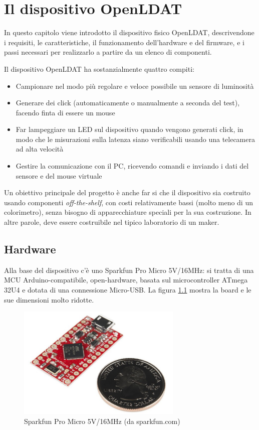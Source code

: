 \setlength{\parskip}{10pt}
\setlength{\parindent}{0pt}
\chapter{Il dispositivo OpenLDAT}
\label{chap:device}

In questo capitolo viene introdotto il dispositivo fisico OpenLDAT, descrivendone i requisiti, le caratteristiche, il funzionamento dell'hardware e del firmware, e i passi necessari per realizzarlo a partire da un elenco di componenti.

Il dispositivo OpenLDAT ha sostanzialmente quattro compiti:
\begin{itemize}
	\item Campionare nel modo più regolare e veloce possibile un sensore di luminosità
	\item Generare dei click (automaticamente o manualmente a seconda del test), facendo finta di essere un mouse
	\item Far lampeggiare un LED sul dispositivo quando vengono generati click, in modo che le misurazioni sulla latenza siano verificabili usando una telecamera ad alta velocità
	\item Gestire la comunicazione con il PC, ricevendo comandi e inviando i dati del sensore e del mouse virtuale
\end{itemize}

Un obiettivo principale del progetto è anche far si che il dispositivo sia costruito usando componenti \textit{off-the-shelf}, con costi relativamente bassi (molto meno di un colorimetro), senza bisogno di apparecchiature speciali per la sua costruzione. In altre parole, deve essere costruibile nel tipico laboratorio di un maker.

\section{Hardware}
Alla base del dispositivo c'è uno Sparkfun Pro Micro 5V/16MHz: si tratta di una MCU Arduino-compatibile, open-hardware, basata sul microcontroller ATmega 32U4 e dotata di una connessione Micro-USB. La figura \ref{fig:sparkfun_promicro} mostra la board e le sue dimensioni molto ridotte.
\begin{figure}[h]
	\centering
	\includegraphics[width=0.7\textwidth]{Dispositivo_files/sparkfun_promicro.jpg}
	\caption{Sparkfun Pro Micro 5V/16MHz (da sparkfun.com)}
	\label{fig:sparkfun_promicro}
\end{figure}

